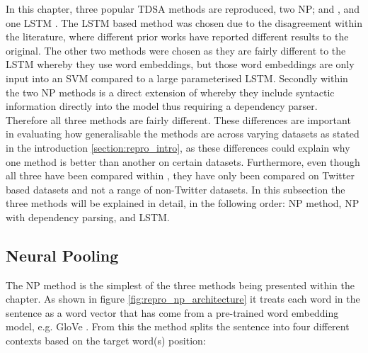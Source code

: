 In this chapter, three popular TDSA methods are reproduced, two NP; \citet{vo2015target} and \citet{wang-etal-2017-tdparse}, and one LSTM \citet{tang-etal-2016-effective}. The LSTM based method was chosen due to the disagreement within the literature, where different prior works have reported different results to the original. The other two methods were chosen as they are fairly different to the LSTM whereby they use word embeddings, but those word embeddings are only input into an SVM compared to a large parameterised LSTM. Secondly within the two NP methods \citet{wang-etal-2017-tdparse} is a direct extension of \citet{vo2015target} whereby they include syntactic information directly into the model thus requiring a dependency parser. Therefore all three methods are fairly different. These differences are important in evaluating how generalisable the methods are across varying datasets as stated in the introduction \ref{section:repro_intro}, as these differences could explain why one method is better than another on certain datasets. Furthermore, even though all three have been compared within \citet{wang-etal-2017-tdparse}, they have only been compared on Twitter based datasets and not a range of non-Twitter datasets. In this subsection the three methods will be explained in detail, in the following order: \citet{vo2015target} NP method, \citet{wang-etal-2017-tdparse} NP with dependency parsing, and \citet{tang-etal-2016-effective} LSTM. 





\FloatBarrier
\subsection{Neural Pooling}
The \citet{vo2015target} NP method is the simplest of the three methods being presented within the chapter. As shown in figure \ref{fig:repro_np_architecture} it treats each word in the sentence as a word vector that has come from a pre-trained word embedding model, e.g. GloVe \citep{pennington-etal-2014-glove}. From this the method splits the sentence into four different contexts based on the target word(s) position:


